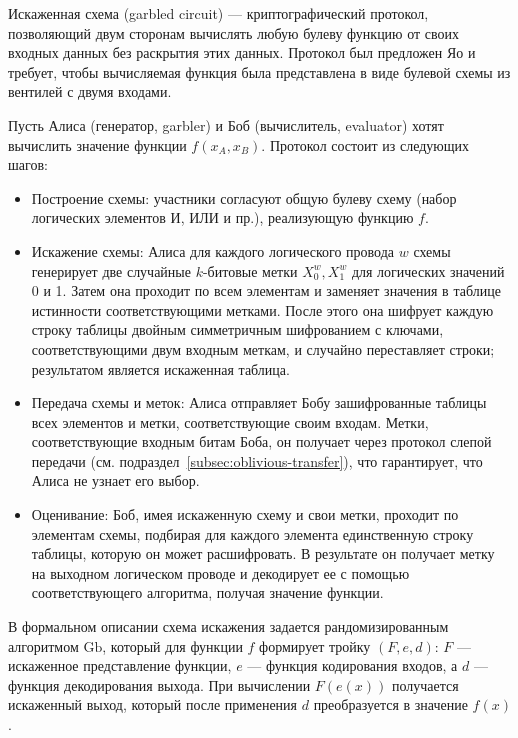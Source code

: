 Искаженная схема (garbled circuit) --- криптографический протокол, позволяющий двум сторонам вычислять любую булеву функцию от своих входных данных без раскрытия этих данных.  Протокол был предложен Яо \cite{15} и требует, чтобы вычисляемая функция была представлена в виде булевой схемы из вентилей с двумя входами.

Пусть Алиса (генератор, garbler) и Боб (вычислитель, evaluator) хотят вычислить значение функции \(f(x_A, x_B)\).  Протокол состоит из следующих шагов:

\begin{itemize}
\item Построение схемы: участники согласуют общую булеву схему (набор логических элементов И, ИЛИ и пр.), реализующую функцию \(f\).

\item Искажение схемы: Алиса для каждого логического провода \(w\) схемы генерирует две случайные \(k\)-битовые метки \(X^w_0, X^w_1\) для логических значений 0 и 1. Затем она проходит по всем элементам и заменяет значения в таблице истинности соответствующими метками. После этого она шифрует каждую строку таблицы двойным симметричным шифрованием с ключами, соответствующими двум входным меткам, и случайно переставляет строки; результатом является искаженная таблица.

\item Передача схемы и меток: Алиса отправляет Бобу зашифрованные таблицы всех элементов и метки, соответствующие своим входам. Метки, соответствующие входным битам Боба, он получает через протокол слепой передачи (см. подраздел~\ref{subsec:oblivious-transfer}), что гарантирует, что Алиса не узнает его выбор.

\item Оценивание: Боб, имея искаженную схему и свои метки, проходит по элементам схемы, подбирая для каждого элемента единственную строку таблицы, которую он может расшифровать. В результате он получает метку на выходном логическом проводе и декодирует ее с помощью соответствующего алгоритма, получая значение функции.
\end{itemize}

В формальном описании схема искажения задается рандомизированным алгоритмом \(\text{Gb}\), который для функции \(f\) формирует тройку \((F,e,d)\): \(F\) --- искаженное представление функции, \(e\) --- функция кодирования входов, а \(d\) --- функция декодирования выхода. При вычислении \(F(e(x))\) получается искаженный выход, который после применения \(d\) преобразуется в значение \(f(x)\).

